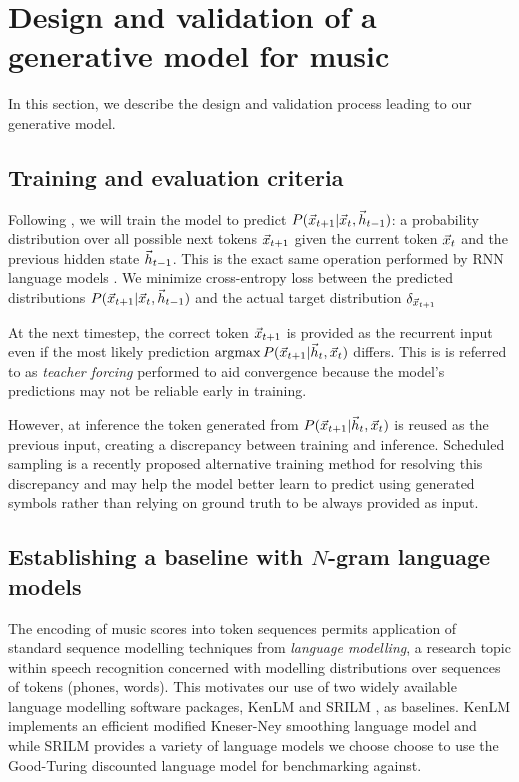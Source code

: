 \section{Design and validation of a generative model for music}

In this section, we describe the design and validation process leading to our
generative model. 

\subsection{Training and evaluation criteria}

Following \citep{mozer1994neural}, we will train the model to predict
$P(\vec{x}_{t+1} | \vec{x}_t, \vec{h}_{t-1})$: a probability distribution over all possible
next tokens $\vec{x}_{t+1}$ given the current token $\vec{x}_{t}$ and the previous hidden
state $\vec{h}_{t-1}$. This is the exact same operation performed by RNN language
models \citep{Mikolov2010}. We minimize cross-entropy loss between the
predicted distributions $P(\vec{x}_{t+1} | \vec{x}_t, \vec{h}_{t-1})$ and the actual target
distribution $\delta_{\vec{x}_{t+1}}$

At the next timestep, the correct token $\vec{x}_{t+1}$ is provided as the recurrent
input even if the most likely prediction $\operatorname*{argmax} P(\vec{x}_{t+1} | \vec{h}_t, \vec{x}_t)$
differs. This is is referred to as \emph{teacher forcing}
\citep{williams1989learning} performed to aid convergence because the model's
predictions may not be reliable early in training.

However, at inference the token generated from $P(\vec{x}_{t+1} | \vec{h}_t, \vec{x}_t)$ is
reused as the previous input, creating a discrepancy between training and
inference. Scheduled sampling \citep{bengio2015scheduled} is a recently
proposed alternative training method for resolving this discrepancy and may
help the model better learn to predict using generated symbols rather than
relying on ground truth to be always provided as input.

\subsection{Establishing a baseline with $N$-gram language models}

The encoding of music scores into token sequences permits application of
standard sequence modelling techniques from \emph{language modelling}, a
research topic within speech recognition concerned with modelling distributions
over sequences of tokens (\eg phones, words). This motivates our use of two
widely available language modelling software packages, KenLM
\citep{Heafield-estimate} and SRILM \citep{stolcke2002srilm}, as baselines.
KenLM implements an efficient modified Kneser-Ney smoothing language model and
while SRILM provides a variety of language models we choose choose to use the
Good-Turing discounted language model for benchmarking against.

